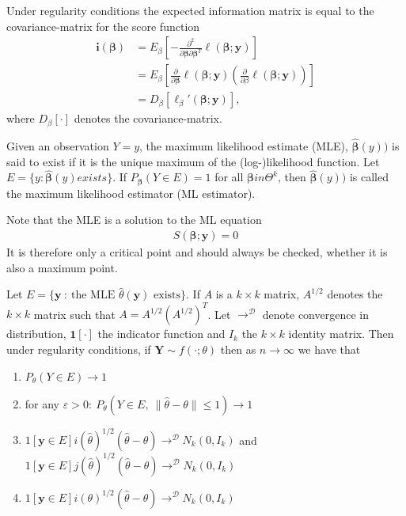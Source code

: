 \begin{lemma} 
\label{lem:fisher_information_matrix}
Under regularity conditions the expected information matrix is equal to the covariance-matrix for the score function
\begin{align*}
    \textbf{i}(\boldsymbol{\beta}) &= E_{\beta}\left[- \frac{\partial^2}{\partial \boldsymbol{\beta} \partial \boldsymbol{\beta}^T} \ell(\boldsymbol{\beta}; \textbf{y})\right] \\
    &= E_{\beta}\left[ \frac{\partial}{\partial \boldsymbol{\beta}}\ell (\boldsymbol{\beta}; \textbf{y}) \left( \frac{\partial}{\partial \beta} \ell (\boldsymbol{\beta}; \textbf{y}) \right) \right] \\
    &= D_{\beta} [\ell_\beta ' (\boldsymbol{\beta}; \textbf{y})],
\end{align*}
where $D_\beta[\cdot]$ denotes the covariance-matrix. 
\end{lemma}

\begin{definition} 
\label{def:MLE}
Given an observation $Y=y$, the maximum likelihood estimate (MLE), $\hat{\boldsymbol{\beta}}(y))$ is said to exist if it is the unique maximum of the (log-)likelihood function. 
Let $E = \{ y : \hat{\boldsymbol{\beta}}(y) exists \}$. If $P_{\boldsymbol{\beta}}(Y \in E) = 1$ for all $\boldsymbol{\beta} in \Theta^k$, then $\hat{\boldsymbol{\beta}}(y))$ is called the maximum likelihood estimator (ML estimator).
\end{definition}
Note that the MLE is a solution to the ML equation
\begin{align*}
    S(\boldsymbol{\beta}; \textbf{y}) = 0
\end{align*}
It is therefore only a critical point and should always be checked, whether it is also a maximum point. 

\begin{theorem}\label{th:distribution_ml_estimator}
Let $E = \{\mathbf{y} \ : \ \text{the MLE } \hat{\theta}(\mathbf{y}) \text{ exists}\}$. 
If $A$ is a $k \times k$ matrix, $A^{1/2}$ denotes the $k \times k$ matrix such that $A = A^{1/2}\left( A^{1/2} \right)^T$.
Let $\rightarrow^\mathcal{D}$ denote convergence in distribution, $\mathbf{1}[\cdot]$ the indicator function and $I_k$ the $k \times k$ identity matrix.
Then under regularity conditions, if $\mathbf{Y} \sim f(\cdot;\theta)$ then as $n \rightarrow \infty$ we have that
\begin{enumerate}
    \item $P_\theta(Y \in E) \rightarrow 1$
    \item for any $\varepsilon > 0: \ P_\theta(Y \in E, \ \|\hat{\theta} - \theta\| \leq 1) \rightarrow 1$
    \item $1[\mathbf{y} \in E] i(\hat{\theta})^{1/2}(\hat{\theta} - \theta) \rightarrow^\mathcal{D} N_k(0, I_k)$ and $1[\mathbf{y} \in E] j(\hat{\theta})^{1/2}(\hat{\theta} - \theta) \rightarrow^\mathcal{D} N_k(0, I_k)$
    \item $1[\mathbf{y} \in E] i(\theta)^{1/2}(\hat{\theta} - \theta) \rightarrow^\mathcal{D} N_k(0, I_k)$
\end{enumerate}
\end{theorem}

